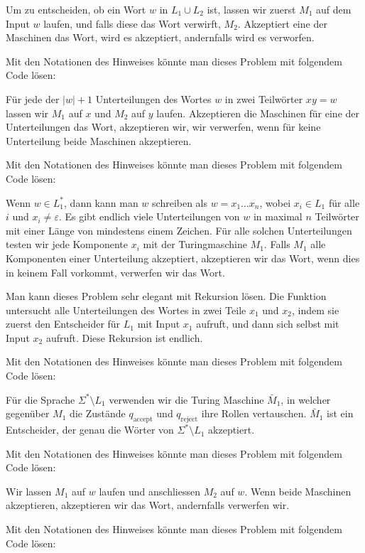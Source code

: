 \begin{loesung}
\begin{teilaufgaben}
\item Um zu entscheiden, ob ein Wort $w$ in $L_1\cup L_2$ ist,
lassen wir zuerst $M_1$ auf dem Input $w$ laufen, und falls
diese das Wort verwirft, $M_2$.
Akzeptiert eine der Maschinen
das Wort, wird es akzeptiert, andernfalls wird es verworfen.

Mit den Notationen des Hinweises könnte man dieses Problem mit folgendem
Code lösen:
\item
Für jede der $|w|+1$ Unterteilungen des Wortes $w$ in zwei
Teilwörter $xy=w$ lassen wir $M_1$ auf $x$ und $M_2$ auf
$y$ laufen.
Akzeptieren die Maschinen für eine der
Unterteilungen das Wort, akzeptieren wir, wir verwerfen, wenn
für keine Unterteilung beide Maschinen akzeptieren.

Mit den Notationen des Hinweises könnte man dieses Problem mit folgendem
Code lösen:
\item
Wenn $w\in L_1^*$, dann kann man $w$ schreiben als
$w=x_1\dots x_n$, wobei $x_i\in L_1$ für alle $i$ und
$x_i\ne \varepsilon$.
Es gibt endlich viele Unterteilungen von $w$ in maximal $n$ Teilwörter
mit einer Länge von mindestens einem Zeichen.
Für alle solchen Unterteilungen testen wir jede Komponente $x_i$ mit der
Turingmaschine $M_1$.
Falls $M_1$ alle Komponenten einer Unterteilung
akzeptiert, akzeptieren wir das Wort, wenn dies in keinem Fall
vorkommt, verwerfen wir das Wort.

Man kann dieses Problem sehr elegant mit Rekursion lösen.
Die Funktion untersucht alle Unterteilungen des Wortes in
zwei Teile $x_1$ und $x_2$, indem sie zuerst den Entscheider
für $L_1$ mit Input $x_1$ aufruft, und dann sich selbst
mit Input $x_2$ aufruft. Diese Rekursion ist endlich.

Mit den Notationen des Hinweises könnte man dieses Problem mit folgendem
Code lösen:
\item
Für die Sprache $\Sigma^*\setminus L_1$ verwenden wir die
Turing Maschine $\bar M_1$, in welcher gegenüber $M_1$
die Zustände $q_{\text{accept}}$ und $q_{\text{reject}}$
ihre Rollen vertauschen. $\bar M_1$ ist ein Entscheider,
der genau die Wörter von $\Sigma^*\setminus L_1$ akzeptiert.

Mit den Notationen des Hinweises könnte man dieses Problem mit folgendem
Code lösen:
\item
Wir lassen $M_1$ auf $w$ laufen und anschliessen $M_2$ auf $w$.
Wenn beide Maschinen akzeptieren, akzeptieren wir das Wort, andernfalls
verwerfen wir.

Mit den Notationen des Hinweises könnte man dieses Problem mit folgendem
Code lösen:
\end{teilaufgaben}
\end{loesung}

